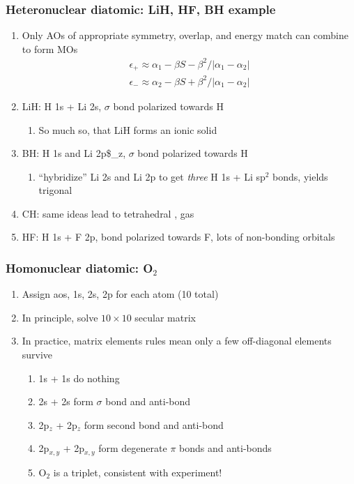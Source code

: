 \documentclass[11pt]{article}
\begin{document}
\subsubsection{Heteronuclear diatomic: LiH, HF, BH example}
\label{sec:orgae4e468}
\begin{enumerate}
\item Only AOs of appropriate symmetry, overlap, and energy match can combine to form MOs
\begin{eqnarray*}
	\epsilon_+\approx \alpha_1- \beta S  - \beta^2/|\alpha_1-\alpha_2| \\
	\epsilon_-\approx \alpha_2 - \beta S + \beta^2/|\alpha_1-\alpha_2|
\end{eqnarray*}
\item LiH: H 1s + Li 2s, \(\sigma\) bond polarized towards H
\begin{enumerate}
\item So much so, that LiH forms an ionic solid
\end{enumerate}
\item BH: H 1s and Li 2p\$\_z, \(\sigma\) bond polarized towards H
\begin{enumerate}
\item ``hybridize'' Li 2s and Li 2p to get \emph{three} H 1s + Li sp\(^2\) bonds, yields trigonal 
\end{enumerate}
\item CH: same ideas lead to tetrahedral , gas
\item HF: H 1s + F 2p, bond polarized towards F, lots of non-bonding orbitals
\end{enumerate}
\subsubsection{Homonuclear diatomic: O\(_2\)}
\label{sec:org440fc14}
\begin{enumerate}
\item Assign aos, 1s, 2s, 2p for each atom (10 total)
\item In principle, solve \(10\times 10\) secular matrix
\item In practice, matrix elements rules mean only a few off-diagonal elements survive
\begin{enumerate}
\item 1s + 1s do nothing
\item 2s + 2s form \(\sigma\) bond and anti-bond
\item 2p\(_z\) + 2p\(_z\) form second bond and anti-bond
\item 2p\(_{x,y}\) + 2p\(_{x,y}\) form degenerate \(\pi\) bonds and anti-bonds
\item O\(_2\) is a triplet, consistent with experiment!
\end{enumerate}
\end{enumerate}
\end{document}
